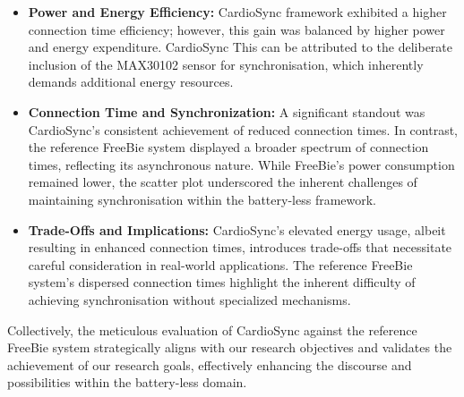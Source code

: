 \begin{itemize}
    \item \textbf{Power and Energy Efficiency:} CardioSync framework exhibited a higher connection time efficiency; however, this gain was balanced by higher power and energy expenditure. CardioSync This can be attributed to the deliberate inclusion of the MAX30102 sensor for synchronisation, which inherently demands additional energy resources.

    \item \textbf{Connection Time and Synchronization:} A significant standout was CardioSync's consistent achievement of reduced connection times. In contrast, the reference FreeBie system displayed a broader spectrum of connection times, reflecting its asynchronous nature. While FreeBie's power consumption remained lower, the scatter plot underscored the inherent challenges of maintaining synchronisation within the battery-less framework.

    \item \textbf{Trade-Offs and Implications:} CardioSync's elevated energy usage, albeit resulting in enhanced connection times, introduces trade-offs that necessitate careful consideration in real-world applications. The reference FreeBie system's dispersed connection times highlight the inherent difficulty of achieving synchronisation without specialized mechanisms.
\end{itemize}

Collectively, the meticulous evaluation of CardioSync against the reference FreeBie system strategically aligns with our research objectives and validates the achievement of our research goals, effectively enhancing the discourse and possibilities within the battery-less domain.




